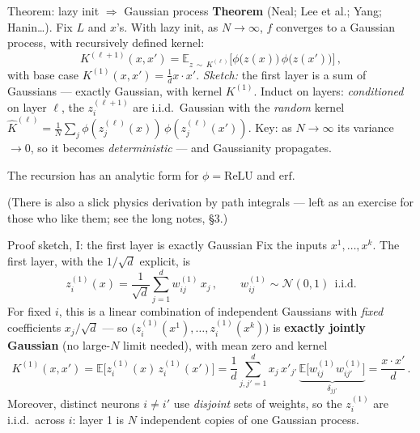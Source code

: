 \documentclass[11pt]{beamer}
\newcommand{\E}{\mathbb{E}}
\newcommand{\hl}[1]{{\color{blue!60!black}\textbf{#1}}}
\begin{document}
\begin{frame}{Theorem: lazy init $\Rightarrow$ Gaussian process}
  \textbf{Theorem} (Neal; Lee et al.; Yang; Hanin\dots).
  Fix $L$ and $x$'s. With lazy init, as $N \to \infty$, $f$ converges to
  a Gaussian process, with recursively defined kernel:
  \[
    K^{(\ell+1)}(x,x') =  \E_{z\,\sim\, K^{(\ell)}}
    \Big[\phi\big(z(x)\big)\,\phi\big(z(x')\big)\Big]\,,
  \]
  with base case $K^{(1)}(x,x') =  \frac{1}{d}x\cdot x'$.
  \emph{Sketch:} the first layer is a sum of Gaussians --- exactly
  Gaussian, with kernel $K^{(1)}$. Induct on layers:
  \emph{conditioned} on layer $\ell$, the $z^{(\ell+1)}_i$ are i.i.d.\
  Gaussian with the \emph{random} kernel
  $\widehat K^{(\ell)} = \frac{1}{N}\sum_j
  \phi(z_j^{(\ell)}(x))\,\phi(z_j^{(\ell)}(x'))$.
  Key: as $N\to\infty$ its variance $\to 0$, so it becomes
  \emph{deterministic} --- and Gaussianity propagates.
  \vspace{2mm}

  The recursion has an analytic form for $\phi = \mathrm{ReLU}$ and
  $\mathrm{erf}$.
  \vspace{1mm}

  {\footnotesize (There is also a slick physics derivation by path
  integrals --- left as an exercise for those who like them; see the
  long notes, \S3.)}
\end{frame}

\begin{frame}{Proof sketch, I: the first layer is exactly Gaussian}
  Fix the inputs $x^1, \dots, x^k$. The first layer, with the
  $1/\sqrt d$ explicit, is
  \[
    z^{(1)}_i(x) = \frac{1}{\sqrt d}\sum_{j=1}^{d} w^{(1)}_{ij}\, x_j\,,
    \qquad w^{(1)}_{ij} \sim \mathcal N(0,1)\ \ \text{i.i.d.}
  \]
  For fixed $i$, this is a linear combination of independent Gaussians
  with \emph{fixed} coefficients $x_j/\sqrt d$ --- so
  $\big(z^{(1)}_i(x^1), \dots, z^{(1)}_i(x^k)\big)$ is \hl{exactly
  jointly Gaussian} (no large-$N$ limit needed), with mean zero and
  kernel
  {\small
  \[
    K^{(1)}(x,x') = \E\big[z^{(1)}_i(x)\, z^{(1)}_i(x')\big]
    = \frac1d \sum_{j,j'=1}^{d} x_j\, x'_{j'}\,
    \underbrace{\E\big[w^{(1)}_{ij} w^{(1)}_{ij'}\big]}_{
    \delta_{jj'}}
    =  \frac{x\cdot x'}{d}\,.
  \]}
  Moreover, distinct neurons $i \neq i'$ use \emph{disjoint} sets of
  weights, so the $z^{(1)}_i$ are i.i.d.\ across $i$: layer 1 is $N$
  independent copies of one Gaussian process.
\end{frame}
\end{document}
